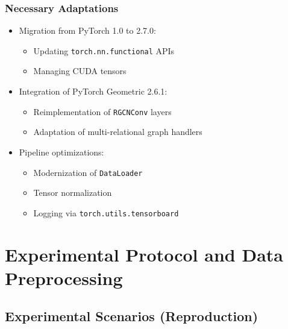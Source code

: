 \documentclass[a4paper,11pt]{article}
\begin{document}
\subsubsection{Necessary Adaptations}
\begin{itemize}
  \item Migration from PyTorch 1.0 to 2.7.0:
  \begin{itemize}
    \item Updating \texttt{torch.nn.functional} APIs
    \item Managing CUDA tensors
  \end{itemize}
  
  \item Integration of PyTorch Geometric 2.6.1:
  \begin{itemize}
    \item Reimplementation of \texttt{RGCNConv} layers
    \item Adaptation of multi-relational graph handlers
  \end{itemize}
  
  \item Pipeline optimizations:
  \begin{itemize}
    \item Modernization of \texttt{DataLoader}
    \item Tensor normalization
    \item Logging via \texttt{torch.utils.tensorboard}
  \end{itemize}
\end{itemize}

\newpage

\section{Experimental Protocol and Data Preprocessing}

\subsection{Experimental Scenarios (Reproduction)}
\end{document}
